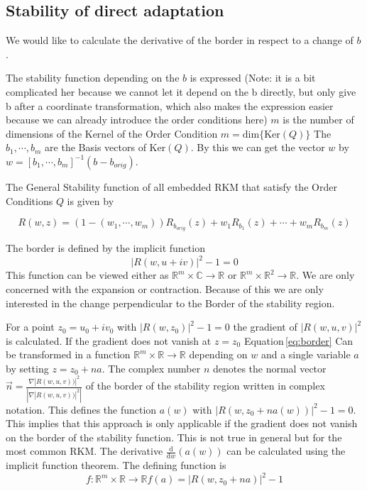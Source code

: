 \documentclass{article}
\begin{document}
\subsection{Stability of direct adaptation}\label{sec:deriv_sr_b}

We would like to calculate the derivative of the border in respect to a change of $b$. 



The stability function depending on the $b$ is expressed (Note: it is a bit complicated her because we cannot let it depend on the b directly, but only give b after a coordinate transformation, which also makes the expression easier because we can already introduce the order conditions here)
$m$ is the number of dimensions of the Kernel of the Order Condition $m = \mathrm{dim}\{\mathrm{Ker} (Q) \}$
The $b_1,\cdots,b_m$  are the Basis vectors of $\mathrm{Ker} (Q)$. By this we can get the vector $w$ by $w = \left[b_1,\cdots,b_m\right]^{-1}(b-b_{orig})$.

The General Stability function of all embedded RKM that satisfy the Order Conditions $Q$ is given by 

\begin{equation}\label{eq:gen_stabilityf}
R(w,z) = (1-(w_1,\cdots,w_m))R_{b_{orig}}(z) + w_1 R_{b_1}(z) + \cdots + w_m R_{b_m}(z)
\end{equation}

The border is defined by the implicit function 
\begin{equation}\label{eq:border}
|R(w,u+iv)|^2 -1 = 0
\end{equation}
This function can be viewed either as $\mathbb{R}^m \times  \mathbb{C} \rightarrow \mathbb{R}$ or $\mathbb{R}^m \times  \mathbb{R}^2 \rightarrow \mathbb{R}$.
We are only concerned with the expansion or contraction. Because of this we are only interested in the change perpendicular to the Border of the stability region. 

For a point $z_0= u_0 +i v_0 $ 
with $ |R(w,z_0)|^2 -1 = 0 $ the gradient of
 $|R(w,u,v)|^2$ is calculated. 
If the gradient does not vanish at $z = z_0$ Equation\,\ref{eq:border} Can be transformed in a function $\mathbb{R}^m \times \mathbb{R} \rightarrow \mathbb{R}$ depending on $w$ and a single variable $a$ by setting $z = z_0 + n a$. The complex number $n$ denotes the normal vector $\vec{n} = \frac{\nabla |R(w,u,v))|^2}{\left| \nabla |R(w,u,v))|^2 \right|}$ of the border of the stability region written in complex notation. This defines the function $a(w)$ with $|R(w,z_0 + n a(w))|^2 -1 = 0$. 
This implies that this approach is only applicable if the gradient does not vanish on the border of the stability function. This is not true in general but for the most common RKM.
The derivative $\frac{\mathrm d}{\mathrm d w} (a(w))$ can be calculated using the implicit function theorem. The defining function is 
\begin{equation}\label{eq:f(w,a)}
f: \mathbb{R}^m \times \mathbb{R} \rightarrow \mathbb{R} f(a) = |R(w,z_0 + n a)|^2 -1 
\end{equation}
\end{document}
